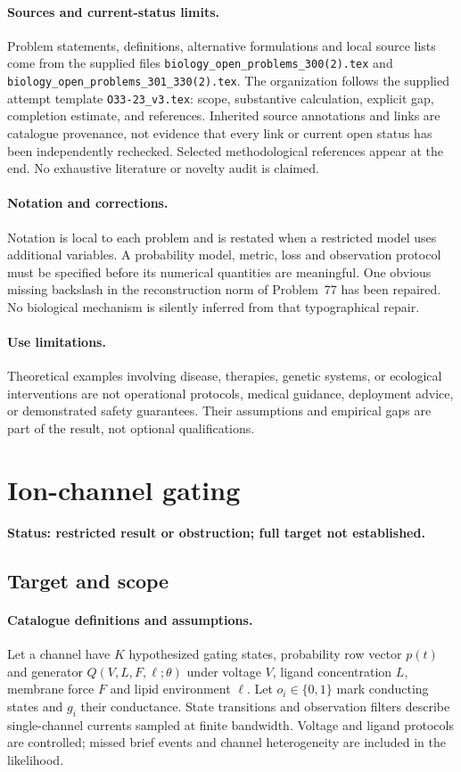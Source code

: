 \documentclass[11pt]{article}
\begin{document}
\paragraph{Sources and current-status limits.}
Problem statements, definitions, alternative formulations and local source lists
come from the supplied files
\texttt{biology\_open\_problems\_300(2).tex} and
\texttt{biology\_open\_problems\_301\_330(2).tex}.
The organization follows the supplied attempt template
\texttt{O33-23\_v3.tex}: scope, substantive calculation, explicit gap,
completion estimate, and references. Inherited source annotations and links are
catalogue provenance, not evidence that every link or current open status has
been independently rechecked. Selected methodological references appear at the
end. No exhaustive literature or novelty audit is claimed.

\paragraph{Notation and corrections.}
Notation is local to each problem and is restated when a restricted model uses
additional variables. A probability model, metric, loss and observation protocol
must be specified before its numerical quantities are meaningful. One obvious
missing backslash in the reconstruction norm of Problem~77 has been repaired.
No biological mechanism is silently inferred from that typographical repair.

\paragraph{Use limitations.}
Theoretical examples involving disease, therapies, genetic systems, or ecological
interventions are not operational protocols, medical guidance, deployment advice,
or demonstrated safety guarantees. Their assumptions and empirical gaps are part
of the result, not optional qualifications.


\section*{Ion-channel gating}
\label{prob:086}
\noindent\textbf{Status: restricted result or obstruction; full target not established.}
\subsection{Target and scope}
\paragraph{Catalogue definitions and assumptions.}
Let a channel have $K$ hypothesized gating states, probability row vector $p(t)$ and generator $Q(V,L,F,\ell;\theta)$ under voltage $V$, ligand concentration $L$, membrane force $F$ and lipid environment $\ell$. Let $o_i\in\{0,1\}$ mark conducting states and $g_i$ their conductance. State transitions and observation filters describe single-channel currents sampled at finite bandwidth. Voltage and ligand protocols are controlled; missed brief events and channel heterogeneity are included in the likelihood.
\end{document}
